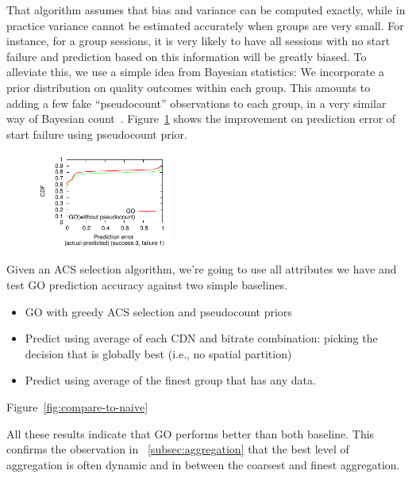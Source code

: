 That algorithm assumes that bias and variance can be computed exactly, while in practice variance cannot be estimated accurately when groups are very small. For instance, for a group sessions, it is very likely to have all sessions with no start failure and prediction based on this information will be greatly biased.
To alleviate this, we use a simple idea from Bayesian statistics: We incorporate a prior distribution on quality outcomes within each group.  This amounts to adding a few fake ``pseudocount'' observations to each group, in a very similar way of Bayesian count~\cite{}.  Figure~\ref{fig:sudocount} shows the improvement on prediction error of start failure using pseudocount prior.


\begin{figure}[h!]
\centering
 \includegraphics[width=0.4\textwidth] {figures/prediction-comparisons/example-pcount-metric3.pdf}
\label{fig:sudocount}
\end{figure}


Given an ACS selection algorithm, we're going to use all attributes we have and test GO prediction accuracy against two simple baselines.
\begin{itemize}
	\item GO with greedy ACS selection and pseudocount priors
	\item Predict using average of each CDN and bitrate combination: picking the decision that is globally best (i.e., no spatial partition)
	\item Predict using average of the finest group that has any data.
\end{itemize}
Figure~\ref{fig:compare-to-naive}


All these results indicate that GO performs better than both baseline. This confirms the observation in \Section~\ref{subsec:aggregation} that the best level of aggregation is often dynamic and in between the coarsest and finest aggregation.

